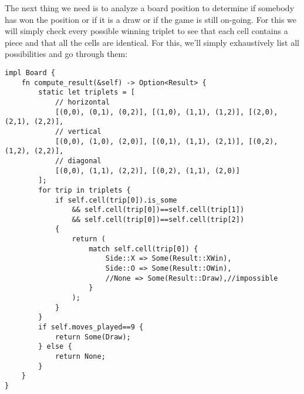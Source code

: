 \documentclass[10pt,dvipdfmx,letterpaper]{report}
\begin{document}
The next thing we need is to analyze a board position to determine if somebody has won the position or
if it is a draw or if the game is still on-going.  For this we will simply check every possible
winning triplet to see that each cell contains a piece and that all the cells are identical.
For this, we'll simply exhaustively list all possibilities and go through them:
{\scriptsize\begin{verbatim}
impl Board {
    fn compute_result(&self) -> Option<Result> {
        static let triplets = [
            // horizontal
            [(0,0), (0,1), (0,2)], [(1,0), (1,1), (1,2)], [(2,0), (2,1), (2,2)],
            // vertical
            [(0,0), (1,0), (2,0)], [(0,1), (1,1), (2,1)], [(0,2), (1,2), (2,2)],
            // diagonal
            [(0,0), (1,1), (2,2)], [(0,2), (1,1), (2,0)]
        ];
        for trip in triplets {
            if self.cell(trip[0]).is_some
                && self.cell(trip[0])==self.cell(trip[1])
                && self.cell(trip[0])==self.cell(trip[2])
            {
                return (
                    match self.cell(trip[0]) {
                        Side::X => Some(Result::XWin),
                        Side::O => Some(Result::OWin),
                        //None => Some(Result::Draw),//impossible
                    }
                );
            }
        }
        if self.moves_played==9 {
            return Some(Draw);
        } else {
            return None;
        }
    }
}
\end{verbatim}}
\end{document}
